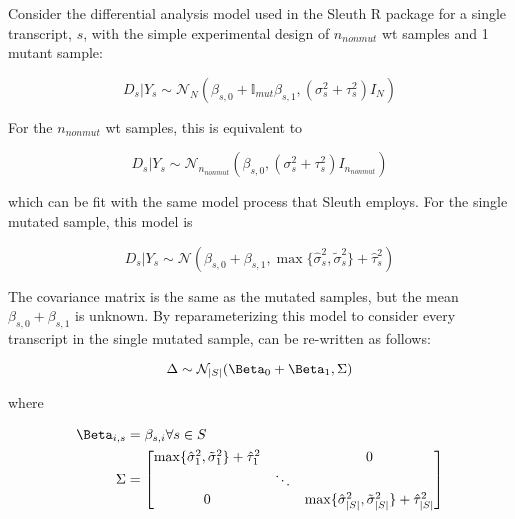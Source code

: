 Consider the differential analysis model used in the Sleuth R package \cite{pimentelDifferentialAnalysisRNAseq2017, yiGenelevelDifferentialAnalysis2018} for a single transcript, $s$, with the simple experimental design of $n_{nonmut}$ \gls{wt} samples and 1 mutant sample:

\begin{equation*}
  D_s | Y_s \sim \mathcal{N}_N \left( \beta_{s,0} + \mathbb{I}_{mut}\beta_{s,1}, (\sigma_s^2 + \tau_s^2)I_N \right)
\end{equation*}

For the $n_{nonmut}$ \gls{wt} samples, this is equivalent to

\begin{equation*}
  D_s | Y_s \sim \mathcal{N}_{n_{nonmut}} \left( \beta_{s,0}, (\sigma_s^2 + \tau_s^2)I_{n_{nonmut}} \right)
\end{equation*}

which can be fit with the same model process that Sleuth employs.
For the single mutated sample, this model is

\begin{equation}
  D_s | Y_s \sim \mathcal{N} \left( \beta_{s, 0} + \beta_{s, 1}, \max\{ \hat{\sigma}_s^2, \tilde{\sigma}_s^2 \} + \hat{\tau}_s^2 \right)
  \label{eqn:single_mut_model}
\end{equation}

The covariance matrix is the same as the mutated samples, but the mean $\beta_{s, 0} + \beta_{s, 1}$ is unknown.
By reparameterizing this model to consider every transcript in the single mutated sample,  can be re-written as follows:

\begin{equation}
  \Delta \sim \mathcal{N}_{|S|}(\Beta_0 + \Beta_1, \Sigma) \\
\end{equation}

where

\begin{align*}
  \Beta_{i,s} &= \beta_{s,i} \forall s \in S \\
  \Sigma &= \begin{bmatrix}
    \max\{ \hat{\sigma}_1^2, \tilde{\sigma}_1^2 \} + \hat{\tau}_1^2 & & 0 \\
    & \ddots & \\
    0 & & \max\{ \hat{\sigma}_{|S|}^2, \tilde{\sigma}_{|S|}^2 \} + \hat{\tau}_{|S|}^2 \\
  \end{bmatrix}
\end{align*}

